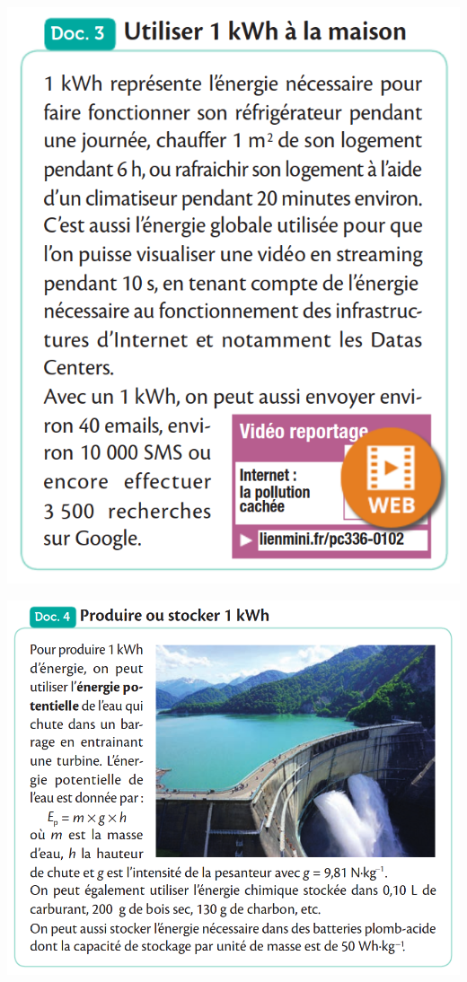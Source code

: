 \documentclass[10pt]{article}
\begin{document}
\begin{minipage}[c]{0.45\textwidth}
	\includegraphics[scale=0.32]{assets/doc3.png}
\end{minipage}
\begin{minipage}[c]{0.45\textwidth}
	\includegraphics[scale=0.32]{assets/doc4.png}
\end{minipage}
\vspace{-5pt}
\end{document}
